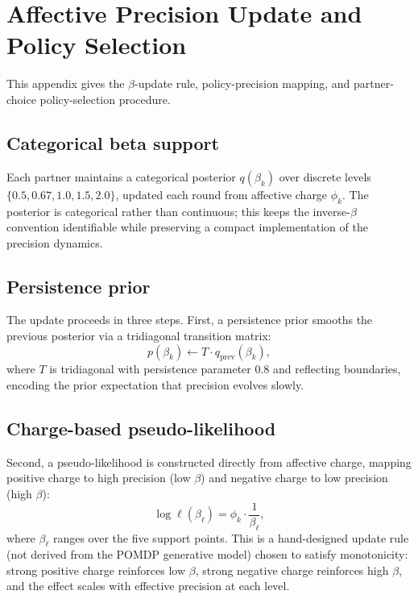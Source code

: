 \section{Affective Precision Update and Policy Selection}
\label{app:precision_update}

This appendix gives the $\beta$-update rule, policy-precision mapping, and partner-choice policy-selection procedure.

\subsection{Categorical beta support}

Each partner maintains a categorical posterior $q(\beta_k)$ over discrete levels $\{0.5, 0.67, 1.0, 1.5, 2.0\}$, updated each round from affective charge $\phi_k$. The posterior is categorical rather than continuous; this keeps the inverse-$\beta$ convention identifiable while preserving a compact implementation of the precision dynamics.

\subsection{Persistence prior}

The update proceeds in three steps. First, a persistence prior smooths the previous posterior via a tridiagonal transition matrix:
\begin{equation}
p(\beta_k) \leftarrow T \cdot q_{\text{prev}}(\beta_k),
\label{eq:persistence}
\end{equation}
where $T$ is tridiagonal with persistence parameter 0.8 and reflecting boundaries, encoding the prior expectation that precision evolves slowly.

\subsection{Charge-based pseudo-likelihood}

Second, a pseudo-likelihood is constructed directly from affective charge, mapping positive charge to high precision (low $\beta$) and negative charge to low precision (high $\beta$):
\begin{equation}
\log \ell(\beta_\ell) = \phi_k \cdot \frac{1}{\beta_\ell},
\label{eq:pseudo_lik}
\end{equation}
where $\beta_\ell$ ranges over the five support points. This is a hand-designed update rule (not derived from the POMDP generative model) chosen to satisfy monotonicity: strong positive charge reinforces low $\beta$, strong negative charge reinforces high $\beta$, and the effect scales with effective precision at each level.

